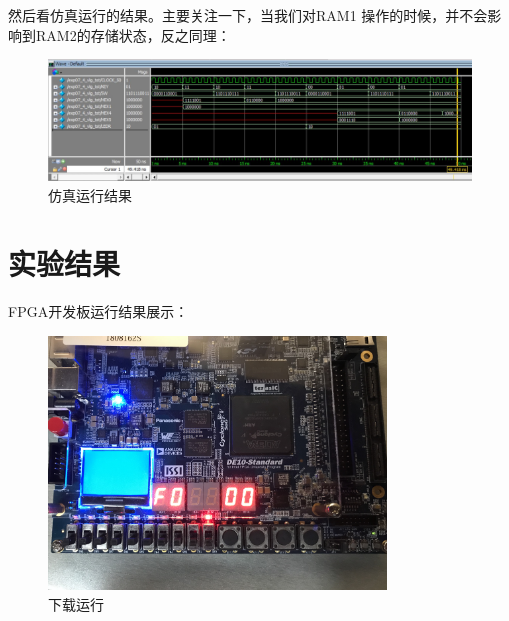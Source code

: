 \documentclass[12pt,a4paper,UTF8]{article}
\begin{document}
然后看仿真运行的结果。主要关注一下，当我们对\mbox{RAM1}
操作的时候，并不会影响到\mbox{RAM2}的存储状态，反之同理：

\begin{figure}[H]
  \centering
  \includegraphics[width=1\textwidth]{sim.JPG}
  \caption{仿真运行结果}
  \label{sim}
\end{figure}

\section{实验结果}
FPGA开发板运行结果展示：

\begin{figure}[H]
  \centering
  \includegraphics[width=0.8\textwidth]{fpga.JPG}
  \caption{下载运行}
  \label{fpga}
\end{figure}
\end{document}
